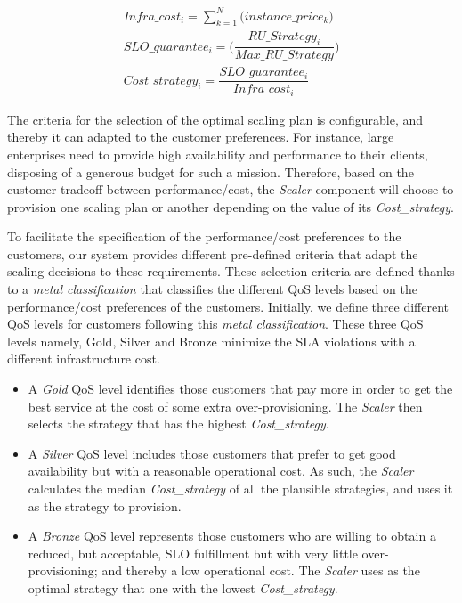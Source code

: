 {\scriptsize
\begin{equation}\label{strategy_cost}
\begin{split}
Infra\_cost_{i} = \sum_{k=1}^N \big( instance\_price_{k} \big) \\
SLO\_guarantee_{i} =  \bigg( \dfrac{ RU\_Strategy_{i} } {Max\_RU\_Strategy} \bigg)  \\
Cost\_strategy_{i} = \dfrac{  SLO\_guarantee_{i}  } {Infra\_cost_{i}}
\end{split}
\end{equation}
}


The criteria for the selection of the optimal scaling plan is configurable, and thereby it can adapted to the customer preferences. For instance, large enterprises need to provide high availability and performance to their clients, disposing of a generous budget for such a mission. Therefore, based on the customer-tradeoff between performance/cost, the \emph{Scaler} component will choose to provision one scaling plan or another depending on the value of its \emph{Cost\_strategy}. 

To facilitate the specification of the performance/cost preferences to the customers, our system provides different pre-defined criteria that adapt the scaling decisions to these requirements. These selection criteria are defined thanks to a \emph{metal classification} that classifies  the different QoS levels based on the performance/cost preferences of the customers. Initially, we define three different QoS levels for customers following this \emph{metal classification}. These three QoS levels namely, Gold, Silver and Bronze minimize the SLA violations with a different infrastructure cost. 

\begin{itemize}
\item A \emph{Gold} QoS level identifies those customers that pay more in order to get the best service at the cost of some extra over-provisioning. The \emph{Scaler} then selects the strategy that has the highest \emph{Cost\_strategy}.
\item A \emph{Silver} QoS level includes those customers that prefer to get good availability but with a reasonable operational cost. As such, the \emph{Scaler} calculates the median \emph{Cost\_strategy} of all the plausible strategies, and uses it as the strategy to provision.
\item A  \emph{Bronze} QoS level represents those customers who are willing to obtain a reduced, but acceptable, SLO fulfillment but with very little over-provisioning; and thereby a low operational cost. The \emph{Scaler} uses as the optimal strategy that one with the lowest \emph{Cost\_strategy}.

\end{itemize}

